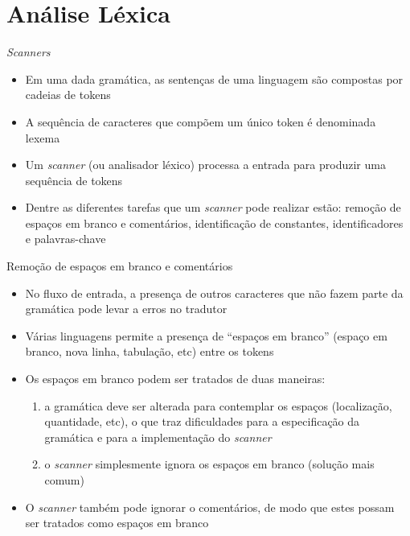 \section{Análise Léxica}

\begin{frame}[fragile]{{\it Scanners}}

    \begin{itemize}
        \item Em uma dada gramática, as sentenças de uma linguagem são compostas por cadeias de tokens

        \item A sequência de caracteres que compõem um único token é denominada lexema

        \item Um \textit{scanner} (ou analisador léxico) processa a entrada para produzir uma sequência de tokens

        \item Dentre as diferentes tarefas que um \textit{scanner} pode realizar estão: remoção de espaços em branco e comentários, identificação de
            constantes, identificadores e palavras-chave
    \end{itemize}

\end{frame}

\begin{frame}[fragile]{Remoção de espaços em branco e comentários}

    \begin{itemize}
        \item No fluxo de entrada, a presença de outros caracteres que não fazem parte da gramática pode levar a erros no tradutor

        \item Várias linguagens permite a presença de ``espaços em branco'' (espaço em branco, nova linha, tabulação, etc) entre os tokens

        \item Os espaços em branco podem ser tratados de duas maneiras:
        \begin{enumerate}
            \item a gramática deve ser alterada para contemplar os espaços (localização, quantidade, etc), o que traz dificuldades para a especificação da gramática
            e para a implementação do \textit{scanner}

            \item o \textit{scanner} simplesmente ignora os espaços em branco (solução mais comum)
        \end{enumerate}

        \item O \textit{scanner} também pode ignorar o comentários, de modo que estes possam ser tratados como espaços em branco
    \end{itemize}

\end{frame}

